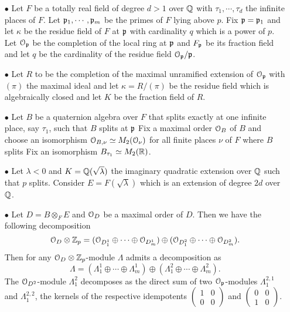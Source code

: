 \documentclass{amsart}
\numberwithin{equation}{section}
\begin{document}
\begin{enumerate}
\item[$\bullet$] Let $F$ be a totally real field of degree $d > 1$ over $\mathbb{Q}$
with $\tau_1,\cdots, \tau_d$ the infinite places of $F$. Let $\mathfrak{p}_1,\cdots,
\mathfrak{p}_m$ be the primes of $F$ lying above $p$. Fix $\mathfrak{p} = \mathfrak{p}_1$ and let 
$\kappa$ be the residue field of $F$ at $\mathfrak{p}$ with cardinality $q$ which is a 
power of $p$. Let $\mathcal{O}_{\mathfrak{p}}$ be the completion of the local ring at $\mathfrak{p}$ and
$F_{\mathfrak{p}}$ be its fraction field and let $q$ be the cardinality of the residue
field $\mathcal{O}_{\mathfrak{p}} /\mathfrak{p}$.


\item[$\bullet$] Let $R$ to be the completion of the maximal
unramified extension of $\mathcal{O}_{\mathfrak{p}}$ with $(\pi)$ the maximal ideal 
and let $\kappa= R/(\pi)$ be the residue field which is algebraically closed
and let $K$ be the fraction field of $R$.
 
\item[$\bullet$] Let $B$ be a quaternion algebra over $F$ that splits exactly
at one infinite place, say $\tau_1$, such that 
\subitem{$\bullet$} $B$ splits at $\mathfrak{p}$
\subitem{$\bullet$} Fix a maximal order $\mathcal{O}_B$ of $B$ and choose an 
isomorphism $\mathcal{O}_{B,\nu} \simeq M_2(\mathcal{O}_\nu)$ for all finite places $\nu$
of $F$ where $B$ splits
\subitem{$\bullet$} Fix an isomorphism $B_{\tau_1} \simeq M_2(\mathbb{R})$.


\item[$\bullet$] Let $\lambda <0$ and $K=\mathbb{Q}(\sqrt{\lambda})$ the imaginary
quadratic extension over $\mathbb{Q}$ such that $p$ splits. Consider 
$E=F(\sqrt{\lambda})$
which is an extension of degree $2d$ over $\mathbb{Q}$. 

\item[$\bullet$] Let $D = B \otimes_F E$ and $\mathcal{O}_D$ be a maximal order of $D$.
Then we have the following decomposition 
$$\mathcal{O}_D \otimes \mathbb{Z}_p = (\mathcal{O}_{D_1^1} \oplus \cdots \oplus \mathcal{O}_{D_m^1}) 
\oplus (\mathcal{O}_{D^2_1} \oplus \cdots \oplus \mathcal{O}_{D^2_m}).$$
Then for any $\mathcal{O}_D \otimes \mathbb{Z}_p$-module  $\Lambda$ admits a decomposition as
$$\Lambda = (\Lambda_1^1 \oplus \cdots \oplus \Lambda_m^1) \oplus 
(\Lambda_1^2 \oplus \cdots \oplus \Lambda_m^2). $$
The $\mathcal{O}_{D^2}$-module $\Lambda_1^2$ decomposes as the direct sum of two
$\mathcal{O}_{\mathfrak{p}}$-modules $\Lambda_1^{2,1}$ and $\Lambda_1^{2,2}$, the kernels of the
respective idempotents $\left(\begin{array}{ll} 1 & 0 \\ 0 & 0 \end{array}
\right)$ and $\left(\begin{array}{ll} 0 & 0 \\ 1 & 0 \end{array}\right)$.



\end{enumerate}
\end{document}
